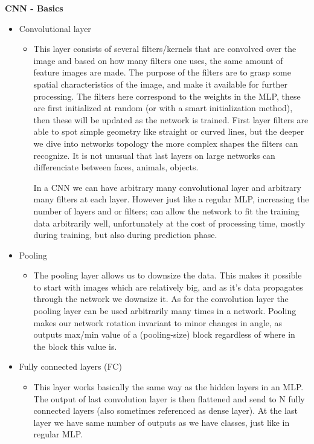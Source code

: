 \documentclass[Report.tex]{subfiles}
\begin{document}
\begin{flushleft}
  \textbf{CNN - Basics} \\
  \begin{itemize}
   \item{Convolutional layer}
   \begin{itemize}
    \item{This layer consists of several filters/kernels that are convolved over the image and based on how many filters one uses, the same amount of feature images are made. The purpose of the filters are to grasp some spatial characteristics of the image, and make it available for further processing.
    The filters here correspond to the weights in the MLP, these are first initialized at random (or with a smart initialization method), then these will be updated as the network is trained. 
First layer filters are able to spot simple geometry like straight or curved lines, but the deeper we dive into networks topology the more complex shapes the filters can recognize. It is not unusual that last layers on large networks can differenciate between faces, animals, objects.\par
    In a CNN we can have arbitrary many convolutional layer and arbitrary many filters at each layer. However just like a regular MLP, increasing the number of layers and or filters; can allow the network to fit the training data arbitrarily well, unfortunately at the cost of processing time, mostly during training, but also during prediction phase.}
   \end{itemize}
   \item{Pooling}
   \begin{itemize}
    \item{The pooling layer allows us to downsize the data. This makes it possible to start with images which are relatively big, and as it's data propagates through the network we downsize it. As for the convolution layer the pooling layer can be used arbitrarily many times in a network.
    Pooling makes our network rotation invariant to minor changes in angle, as outputs max/min value of a (pooling-size) block regardless of where in the block this value is.}
   \end{itemize}
   \item{Fully connected layers (FC)}
   \begin{itemize}
    \item{This layer works basically the same way as the hidden layers in an MLP.
    The output of last convolution layer is then flattened and send to N fully connected layers (also sometimes referenced as dense layer). At the last layer we have same number of outputs as we have classes, just like in regular MLP.}
   \end{itemize}
  \end{itemize}
\end{flushleft}
\end{document}
